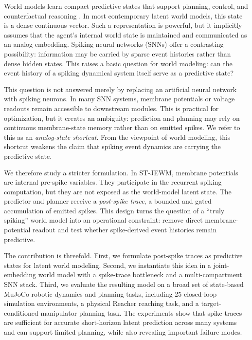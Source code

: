 \documentclass[10pt]{article}
\newcommand{\method}{ST-JEWM}
\begin{document}
World models learn compact predictive states that support planning, control, and counterfactual reasoning \citep{worldmodels2018,dreamer,lewm2024}. In most contemporary latent world models, this state is a dense continuous vector. Such a representation is powerful, but it implicitly assumes that the agent's internal world state is maintained and communicated as an analog embedding. Spiking neural networks (SNNs) offer a contrasting possibility: information may be carried by sparse event histories rather than dense hidden states. This raises a basic question for world modeling: can the event history of a spiking dynamical system itself serve as a predictive state?

This question is not answered merely by replacing an artificial neural network with spiking neurons. In many SNN systems, membrane potentials or voltage readouts remain accessible to downstream modules. This is practical for optimization, but it creates an ambiguity: prediction and planning may rely on continuous membrane-state memory rather than on emitted spikes. We refer to this as an \emph{analog-state shortcut}. From the viewpoint of world modeling, this shortcut weakens the claim that spiking event dynamics are carrying the predictive state.

We therefore study a stricter formulation. In \method{}, membrane potentials are internal pre-spike variables. They participate in the recurrent spiking computation, but they are not exposed as the world-model latent state. The predictor and planner receive a \emph{post-spike trace}, a bounded and gated accumulation of emitted spikes. This design turns the question of a ``truly spiking'' world model into an operational constraint: remove direct membrane-potential readout and test whether spike-derived event histories remain predictive.

The contribution is threefold. First, we formulate post-spike traces as predictive states for latent world modeling. Second, we instantiate this idea in a joint-embedding world model with a spike-trace bottleneck and a multi-compartment SNN stack. Third, we evaluate the resulting model on a broad set of state-based MuJoCo robotic dynamics and planning tasks, including 25 closed-loop simulation environments, a physical Reacher reaching task, and a target-conditioned manipulator planning task. The experiments show that spike traces are sufficient for accurate short-horizon latent prediction across many systems and can support limited planning, while also revealing important failure modes.
\end{document}
